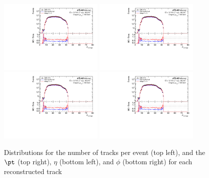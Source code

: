 \begin{figure}[h!]
  \centering
  \includegraphics[page=128,width=0.45\textwidth]{figures/ZjetOmnifoldMCDataComp.pdf}
  \includegraphics[page=144,width=0.45\textwidth]{figures/ZjetOmnifoldMCDataComp.pdf} \\
  \includegraphics[page=148,width=0.45\textwidth]{figures/ZjetOmnifoldMCDataComp.pdf}
  \includegraphics[page=152,width=0.45\textwidth]{figures/ZjetOmnifoldMCDataComp.pdf}
  \caption{Distributions for the number of tracks per event (top left), and the $\pt$ (top right), $\eta$ (bottom left), and $\phi$ (bottom right) for each reconstructed track}
  \label{fig:trackInfo}
\end{figure}


